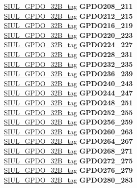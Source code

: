 \begin{DoxyCompactItemize}
\begin{tabbing}
\>\>\mbox{\hyperlink{unionSIUL__GPDO__32B__tag}{SIUL\_GPDO\_32B\_tag}} {\bfseries GPDO208\_211}\\
\>\>\mbox{\hyperlink{unionSIUL__GPDO__32B__tag}{SIUL\_GPDO\_32B\_tag}} {\bfseries GPDO212\_215}\\
\>\>\mbox{\hyperlink{unionSIUL__GPDO__32B__tag}{SIUL\_GPDO\_32B\_tag}} {\bfseries GPDO216\_219}\\
\>\>\mbox{\hyperlink{unionSIUL__GPDO__32B__tag}{SIUL\_GPDO\_32B\_tag}} {\bfseries GPDO220\_223}\\
\>\>\mbox{\hyperlink{unionSIUL__GPDO__32B__tag}{SIUL\_GPDO\_32B\_tag}} {\bfseries GPDO224\_227}\\
\>\>\mbox{\hyperlink{unionSIUL__GPDO__32B__tag}{SIUL\_GPDO\_32B\_tag}} {\bfseries GPDO228\_231}\\
\>\>\mbox{\hyperlink{unionSIUL__GPDO__32B__tag}{SIUL\_GPDO\_32B\_tag}} {\bfseries GPDO232\_235}\\
\>\>\mbox{\hyperlink{unionSIUL__GPDO__32B__tag}{SIUL\_GPDO\_32B\_tag}} {\bfseries GPDO236\_239}\\
\>\>\mbox{\hyperlink{unionSIUL__GPDO__32B__tag}{SIUL\_GPDO\_32B\_tag}} {\bfseries GPDO240\_243}\\
\>\>\mbox{\hyperlink{unionSIUL__GPDO__32B__tag}{SIUL\_GPDO\_32B\_tag}} {\bfseries GPDO244\_247}\\
\>\>\mbox{\hyperlink{unionSIUL__GPDO__32B__tag}{SIUL\_GPDO\_32B\_tag}} {\bfseries GPDO248\_251}\\
\>\>\mbox{\hyperlink{unionSIUL__GPDO__32B__tag}{SIUL\_GPDO\_32B\_tag}} {\bfseries GPDO252\_255}\\
\>\>\mbox{\hyperlink{unionSIUL__GPDO__32B__tag}{SIUL\_GPDO\_32B\_tag}} {\bfseries GPDO256\_259}\\
\>\>\mbox{\hyperlink{unionSIUL__GPDO__32B__tag}{SIUL\_GPDO\_32B\_tag}} {\bfseries GPDO260\_263}\\
\>\>\mbox{\hyperlink{unionSIUL__GPDO__32B__tag}{SIUL\_GPDO\_32B\_tag}} {\bfseries GPDO264\_267}\\
\>\>\mbox{\hyperlink{unionSIUL__GPDO__32B__tag}{SIUL\_GPDO\_32B\_tag}} {\bfseries GPDO268\_271}\\
\>\>\mbox{\hyperlink{unionSIUL__GPDO__32B__tag}{SIUL\_GPDO\_32B\_tag}} {\bfseries GPDO272\_275}\\
\>\>\mbox{\hyperlink{unionSIUL__GPDO__32B__tag}{SIUL\_GPDO\_32B\_tag}} {\bfseries GPDO276\_279}\\
\>\>\mbox{\hyperlink{unionSIUL__GPDO__32B__tag}{SIUL\_GPDO\_32B\_tag}} {\bfseries GPDO280\_283}\\

\end{tabbing}
\end{DoxyCompactItemize}
